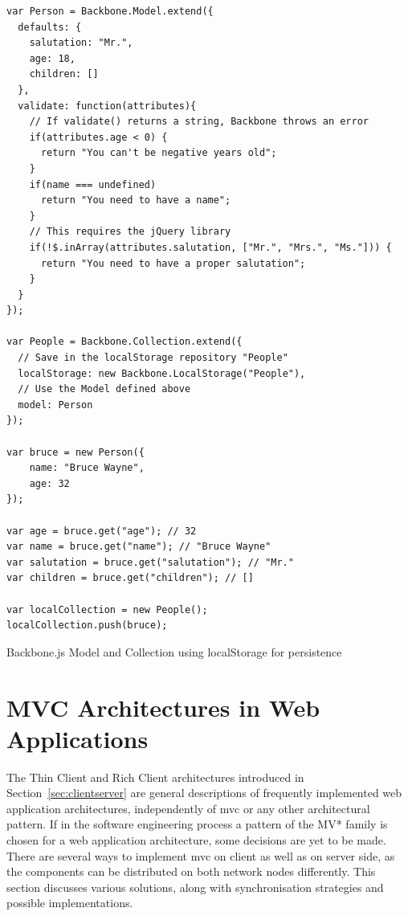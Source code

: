 \begin{listing}[H]
\begin{verbatim}
var Person = Backbone.Model.extend({
  defaults: {
    salutation: "Mr.",
    age: 18,
    children: []
  },
  validate: function(attributes){
    // If validate() returns a string, Backbone throws an error
    if(attributes.age < 0) {
      return "You can't be negative years old";
    }
    if(name === undefined)
      return "You need to have a name";
    }
    // This requires the jQuery library
    if(!$.inArray(attributes.salutation, ["Mr.", "Mrs.", "Ms."])) {
      return "You need to have a proper salutation";
    }
  }
});

var People = Backbone.Collection.extend({
  // Save in the localStorage repository "People"
  localStorage: new Backbone.LocalStorage("People"),
  // Use the Model defined above
  model: Person
});

var bruce = new Person({
	name: "Bruce Wayne",
	age: 32
});

var age = bruce.get("age"); // 32
var name = bruce.get("name"); // "Bruce Wayne"
var salutation = bruce.get("salutation"); // "Mr."
var children = bruce.get("children"); // []

var localCollection = new People();
localCollection.push(bruce);
\end{verbatim}
\caption{Backbone.js Model and Collection using localStorage for persistence}
\label{lst:localstorage}
\end{listing}

\newpage
\section{MVC Architectures in Web Applications}
\label{sec:mvcwebarch}
The Thin Client and Rich Client architectures introduced in Section~\ref{sec:clientserver} are general descriptions of frequently implemented web application architectures, independently of \acl{mvc} or any other architectural pattern. If in the software engineering process a pattern of the MV* family is chosen for a web application architecture, some decisions are yet to be made. There are several ways to implement \acl{mvc} on client as well as on server side, as the components can be distributed on both network nodes differently. This section discusses various solutions, along with synchronisation strategies and possible implementations.

